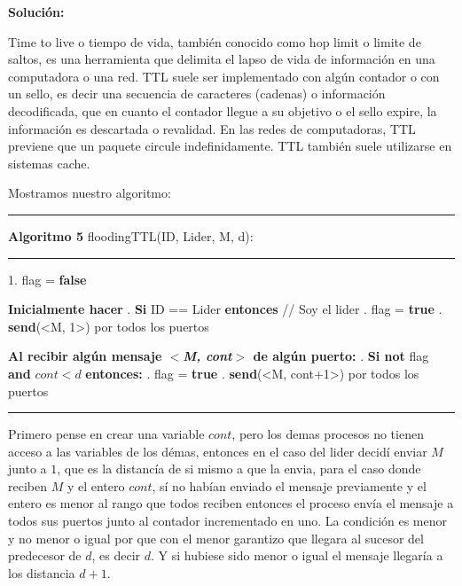 \documentclass[8pt, letterpaper]{article}
\begin{document}
\begin{enumerate}
  \hfill\break
  \ttfamily
  {\bf Solución:}

  Time to live o tiempo de vida, también conocido como hop limit o limite de
  saltos, es una herramienta que delimita el lapso de vida de información en
  una computadora o una red. TTL suele ser implementado con algún contador o
  con un sello, es decir una secuencia de caracteres (cadenas) o información
  decodificada, que en cuanto el contador llegue a su objetivo o el sello
  expire, la información es descartada o revalidad. En las redes de
  computadoras, TTL previene que un paquete circule indefinidamente.
  TTL también suele utilizarse en sistemas cache.

  \hfill\break
  Mostramos nuestro algoritmo:
  
  \rule{1\textwidth}{0.2mm}
  {\bf Algoritmo 5} floodingTTL(ID, Lider, M, d):
  \hfill\break
  \rule{1\textwidth}{0.2mm}
  1. flag = {\bf false}
  
  \hfill\break
  \hspace*{.2cm} {\bf Inicialmente hacer}
  \hfill{}. {\bf Si} ID == Lider {\bf entonces} // Soy el lider
  \hfill{}. \hspace{0.5cm} flag = {\bf true}
  \hfill{}. \hspace{0.5cm} {\bf send}(<M, 1>) por todos los puertos

  \hfill\break
  \hspace{0.2cm} {\bf Al recibir algún mensaje $<${\it M, cont}$>$ de algún
    puerto:}
  \hfill{}. {\bf Si not} flag {\bf and} $cont < d$ {\bf entonces:}
  \hfill{}. \hspace{1cm} flag = {\bf true}
  \hfill{}. \hspace{1cm} {\bf send}(<M, cont+1>) por todos los puertos
  \hfill\break
  \rule{1\textwidth}{0.2mm}

  Primero pense en crear una variable $cont$, pero los demas procesos no tienen
  acceso a las variables de los démas, entonces en el caso del lider
  decidí enviar $M$ junto a $1$, que es la distancía de si mismo a que la envia,
  para el caso donde reciben $M$ y el entero $cont$, sí no habían enviado el
  mensaje previamente y el entero es menor al rango que todos reciben entonces
  el proceso envía el mensaje a todos sus puertos junto al contador incrementado
  en uno. La condición es menor y no menor o igual por que con el menor
  garantizo que llegara al sucesor del predecesor de $d$, es decir $d$. Y si
  hubiese sido menor o igual el mensaje llegaría a los distancia $d+1$.


\end{enumerate}
\end{document}
